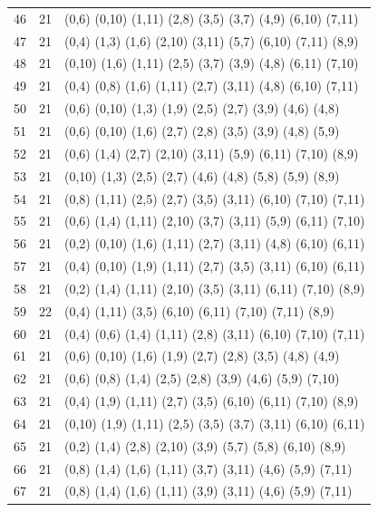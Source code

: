 \begin{appendix}
{\begin{longtable}{lll}
46 & 21 & (0,6)   (0,10) (1,11) (2,8)   (3,5)   (3,7)   (4,9)   (6,10)  (7,11)\\
47 & 21 & (0,4)   (1,3)  (1,6)  (2,10)  (3,11)  (5,7)   (6,10)  (7,11)  (8,9)\\
48 & 21 & (0,10)  (1,6)  (1,11) (2,5)   (3,7)   (3,9)   (4,8)   (6,11)  (7,10)\\
49 & 21 & (0,4)   (0,8)  (1,6)  (1,11)  (2,7)   (3,11)  (4,8)   (6,10)  (7,11)\\
50 & 21 & (0,6)   (0,10) (1,3)  (1,9)   (2,5)   (2,7)   (3,9)   (4,6)   (4,8)\\
51 & 21 & (0,6)   (0,10) (1,6)  (2,7)   (2,8)   (3,5)   (3,9)   (4,8)   (5,9)\\
52 & 21 & (0,6)   (1,4)  (2,7)  (2,10)  (3,11)  (5,9)   (6,11)  (7,10)  (8,9)\\
53 & 21 & (0,10)  (1,3)  (2,5)  (2,7)   (4,6)   (4,8)   (5,8)   (5,9)   (8,9)\\
54 & 21 & (0,8)   (1,11) (2,5)  (2,7)   (3,5)   (3,11)  (6,10)  (7,10)  (7,11)\\
55 & 21 & (0,6)   (1,4)  (1,11) (2,10)  (3,7)   (3,11)  (5,9)   (6,11)  (7,10)\\
56 & 21 & (0,2)   (0,10) (1,6)  (1,11)  (2,7)   (3,11)  (4,8)   (6,10)  (6,11)\\
57 & 21 & (0,4)   (0,10) (1,9)  (1,11)  (2,7)   (3,5)   (3,11)  (6,10)  (6,11)\\
58 & 21 & (0,2)   (1,4)  (1,11) (2,10)  (3,5)   (3,11)  (6,11)  (7,10)  (8,9)\\
59 & 22 & (0,4)   (1,11) (3,5)  (6,10)  (6,11)  (7,10)  (7,11)  (8,9)   \\
60 & 21 & (0,4)   (0,6)  (1,4)  (1,11)  (2,8)   (3,11)  (6,10)  (7,10)  (7,11)\\
61 & 21 & (0,6)   (0,10) (1,6)  (1,9)   (2,7)   (2,8)   (3,5)   (4,8)   (4,9)\\
62 & 21 & (0,6)   (0,8)  (1,4)  (2,5)   (2,8)   (3,9)   (4,6)   (5,9)   (7,10)\\
63 & 21 & (0,4)   (1,9)  (1,11) (2,7)   (3,5)   (6,10)  (6,11)  (7,10)  (8,9)\\
64 & 21 & (0,10)  (1,9)  (1,11) (2,5)   (3,5)   (3,7)   (3,11)  (6,10)  (6,11)\\
65 & 21 & (0,2)   (1,4)  (2,8)  (2,10)  (3,9)   (5,7)   (5,8)   (6,10)  (8,9)\\
66 & 21 & (0,8)   (1,4)  (1,6)  (1,11)  (3,7)   (3,11)  (4,6)   (5,9)   (7,11)\\
67 & 21 & (0,8)   (1,4)  (1,6)  (1,11)  (3,9)   (3,11)  (4,6)   (5,9)   (7,11)\\

\end{longtable}}
\end{appendix}
